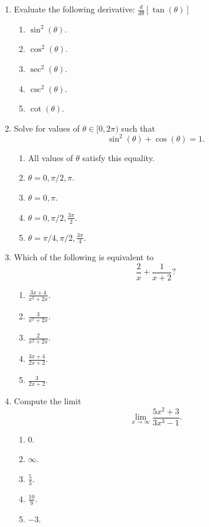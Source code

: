 \documentclass{article}
\begin{document}
\begin{enumerate}
  \item Evaluate the following derivative: $\frac{d}{d\theta}[\tan(\theta)]$
  \begin{enumerate}
    \item $\sin^2(\theta)$.
    \item $\cos^2(\theta)$.
    \item $\sec^2(\theta)$. %
    \item $\csc^2(\theta)$.
    \item $\cot(\theta)$.
  \end{enumerate}
  
  \item Solve for values of $\theta\in[0, 2\pi)$ such that \[\sin^2(\theta)+\cos(\theta)=1.\]
  \begin{enumerate}
    \item All values of $\theta$ satisfy this equality.
    \item $\theta= 0, \pi/2, \pi$.
    \item $\theta= 0, \pi$.
    \item $\theta= 0, \pi/2, \frac{3\pi}{2}$. %
    \item $\theta= \pi/4, \pi/2, \frac{3\pi}{4}$.
  \end{enumerate}
  
  \newpage
  
  \item Which of the following is equivalent to \[\frac{2}{x}+\frac{1}{x+2}?\]
  \begin{enumerate}
    \item $\frac{3x+4}{x^2+2x}$.  %
    \item $\frac{3}{x^2+2x}$.
    \item $\frac{2}{x^2+2x}$.
    \item $\frac{3x+4}{2x+2}$.
    \item $\frac{3}{2x+2}$.
  \end{enumerate}
  
  \item Compute the limit \[\lim_{x\to\infty} \frac{5x^2+3}{3x^3-1}.\]
  \begin{enumerate}
    \item $0$.  %
    \item $\infty$.
    \item $\frac{5}{3}$.
    \item $\frac{10}{9}$.
    \item $-3$.
  \end{enumerate}
  

\end{enumerate}
\end{document}
